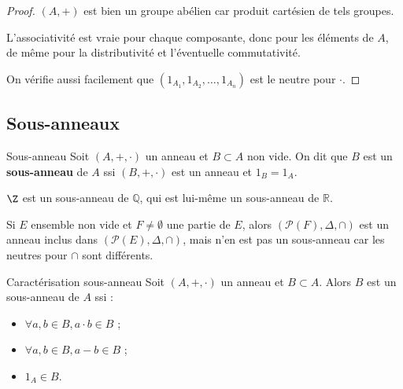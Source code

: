 \begin{proof}
    $(A, +)$ est bien un groupe abélien car produit cartésien de tels groupes.

    \svspace L'associativité est vraie pour chaque composante, donc pour les éléments de $A$, 
    de même pour la distributivité et l'éventuelle commutativité.

    \svspace On vérifie aussi facilement que 
    $(1_{A_1}, 1_{A_2}, \ldots, 1_{A_n})$ est le neutre pour $\cdot$.
\end{proof}


\subsection{Sous-anneaux}

\begin{definition}{Sous-anneau}{}
    Soit $(A, +, \cdot)$ un anneau et $B \subset A$ non vide. On dit que $B$ est un 
    \textbf{sous-anneau} de $A$ ssi $(B, +, \cdot)$ est un anneau et $1_B = 1_A$.
\end{definition}

\begin{exemple}
    $\Z$ est un sous-anneau de $\mathbb{Q}$, qui est lui-même un sous-anneau de $\mathbb{R}$.

    Si $E$ ensemble non vide et $F \neq \emptyset$ une partie de $E$, alors
    $(\mathscr{P}(F), \Delta, \cap)$ est un anneau inclus dans $(\mathscr{P}(E), \Delta, \cap)$,
    mais n'en est pas un sous-anneau car les neutres pour $\cap$ sont différents.  
\end{exemple}

\begin{proposition}{Caractérisation sous-anneau}{}
    Soit $(A, +, \cdot)$ un anneau et $B \subset A$. Alors 
    $B$ est un sous-anneau de $A$ ssi : 
    \begin{itemize}
        \item $\forall a, b \in B, a \cdot b \in B$ ;
        \item $\forall a, b \in B, a - b \in B$ ;
        \item $1_A \in B$.
    \end{itemize}
    
\end{proposition}


